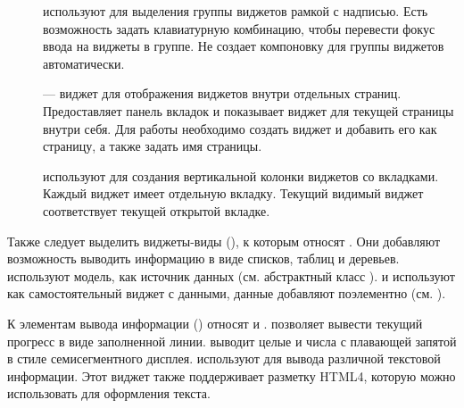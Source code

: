 \begin{description}
\item[] используют для выделения группы виджетов рамкой с надписью. Есть возможность задать
клавиатурную комбинацию, чтобы перевести фокус ввода на виджеты в группе. Не создает компоновку для группы виджетов
автоматически.
\item[] --- виджет для отображения виджетов внутри отдельных страниц. Предоставляет панель
вкладок и показывает виджет для текущей страницы внутри себя. Для работы необходимо создать виджет и добавить его как
страницу, а также задать имя страницы.
\item[] используют для создания вертикальной колонки виджетов со вкладками. Каждый виджет имеет
отдельную вкладку. Текущий видимый виджет соответствует текущей открытой вкладке. 
\end{description}

Также следует выделить виджеты-виды (), к которым относят .
 Они добавляют возможность выводить информацию в виде
списков, таблиц и деревьев.   используют модель, 
как источник данных (см. абстрактный
класс  ).   и   
используют как самостоятельный виджет с данными,
данные добавляют поэлементно (см.  ). 

К элементам вывода информации () относят
 и .
 позволяет вывести текущий
прогресс в виде заполненной линии. 
выводит целые и числа с плавающей запятой в стиле семисегментного дисплея.
 используют для вывода различной текстовой
информации. Этот виджет также поддерживает разметку HTML4, которую можно использовать для оформления текста.


